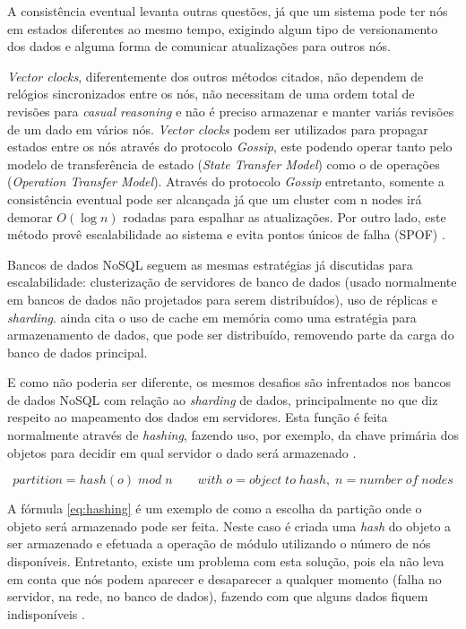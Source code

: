 \documentclass[diss]{template/setrem}
\begin{document}
A consistência eventual levanta outras questões, já que um sistema pode ter nós em estados diferentes ao mesmo tempo, exigindo algum tipo de versionamento dos dados e alguma forma de comunicar atualizações para outros nós.

\emph{Vector clocks}, diferentemente dos outros métodos citados, não dependem de relógios sincronizados entre os nós, não necessitam de uma ordem total de revisões para \emph{casual reasoning} e não é preciso armazenar e manter variás revisões de um dado em vários nós. \emph{Vector clocks} podem ser utilizados para propagar estados entre os nós através do protocolo \emph{Gossip}, este podendo operar tanto pelo modelo de transferência de estado (\emph{State Transfer Model}) como o de operações (\emph{Operation Transfer Model}). Através do protocolo \emph{Gossip} entretanto, somente a consistência eventual pode ser alcançada já que um cluster com n nodes irá demorar $O(\log{n})$ rodadas para espalhar as atualizações. Por outro lado, este método provê escalabilidade ao sistema e evita pontos únicos de falha (SPOF) \citep{Strauch2011}.

Bancos de dados NoSQL seguem as mesmas estratégias já discutidas para escalabilidade: clusterização de servidores de banco de dados (usado normalmente em bancos de dados não projetados para serem distribuídos), uso de réplicas e \emph{sharding}. \citet{Strauch2011} ainda cita o uso de cache em memória como uma estratégia para armazenamento de dados, que pode ser distribuído, removendo parte da carga do banco de dados principal.

E como não poderia ser diferente, os mesmos desafios são infrentados nos bancos de dados NoSQL com relação ao \emph{sharding} de dados, principalmente no que diz respeito ao mapeamento dos dados em servidores. Esta função é feita normalmente através de \emph{hashing}, fazendo uso, por exemplo, da chave primária dos objetos para decidir em qual servidor o dado será armazenado \citep{Strauch2011}.

\begin{equation}
\label{eq:hashing}
partition = hash(o)\; mod\; n \qquad with\; o = object\; to\; hash,\; n = number\; of\; nodes
\end{equation}

A fórmula \ref{eq:hashing} é um exemplo de como a escolha da partição onde o objeto será armazenado pode ser feita. Neste caso é criada uma \emph{hash} do objeto a ser armazenado e efetuada a operação de módulo utilizando o número de nós disponíveis. Entretanto, existe um problema com esta solução, pois ela não leva em conta que nós podem aparecer e desaparecer a qualquer momento (falha no servidor, na rede, no banco de dados), fazendo com que alguns dados fiquem indisponíveis \citep{Strauch2011}.
\end{document}
